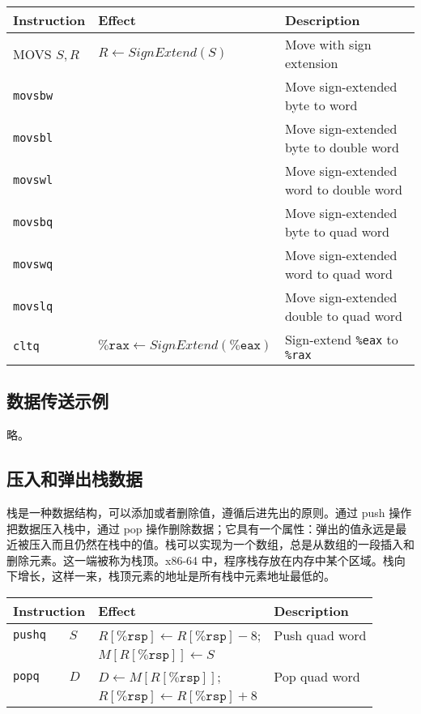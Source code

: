 \begin{table}[!ht]
    \centering
    \begin{tabular}{lll}
        \toprule
        Instruction & Effect & Description \\
        \midrule
        MOVS \quad $S, R$ & $R \leftarrow SignExtend(S)$ & Move with sign extension \\
        \quad\texttt{movsbw} & & Move sign-extended byte to word \\
        \quad\texttt{movsbl} & & Move sign-extended byte to double word \\
        \quad\texttt{movswl} & & Move sign-extended word to double word \\
        \quad\texttt{movsbq} & & Move sign-extended byte to quad word \\
        \quad\texttt{movswq} & & Move sign-extended word to quad word \\
        \quad\texttt{movslq} & & Move sign-extended double to quad word \\
        \texttt{cltq} & $\texttt{\%rax} \leftarrow SignExtend(\texttt{\%eax})$ & Sign-extend \texttt{\%eax} to \texttt{\%rax} \\
        \bottomrule
    \end{tabular}
\end{table}

\subsection{数据传送示例}

略。

\subsection{压入和弹出栈数据}

栈是一种数据结构，可以添加或者删除值，遵循后进先出的原则。通过 push 操作把数据压入栈中，通过 pop 操作删除数据；它具有一个属性：弹出的值永远是最近被压入而且仍然在栈中的值。栈可以实现为一个数组，总是从数组的一段插入和删除元素。这一端被称为栈顶。x86-64 中，程序栈存放在内存中某个区域。栈向下增长，这样一来，栈顶元素的地址是所有栈中元素地址最低的。

\begin{table}[!ht]
    \centering
    \begin{tabular}{llll}
        \toprule
        \multicolumn{2}{l}{Instruction} & Effect & Description \\
        \midrule
        \texttt{pushq} & $S$ & $R[\texttt{\%rsp}] \leftarrow R[\texttt{\%rsp}] - 8$; & Push quad word \\
        & & $M[R[\texttt{\%rsp}]] \leftarrow S$ & \\
        \texttt{popq} & $D$ & $D \leftarrow M[R[\texttt{\%rsp}]]$; & Pop quad word \\
        & & $R[\texttt{\%rsp}] \leftarrow R[\texttt{\%rsp}] + 8$ & \\
        \bottomrule
    \end{tabular}
\end{table}


